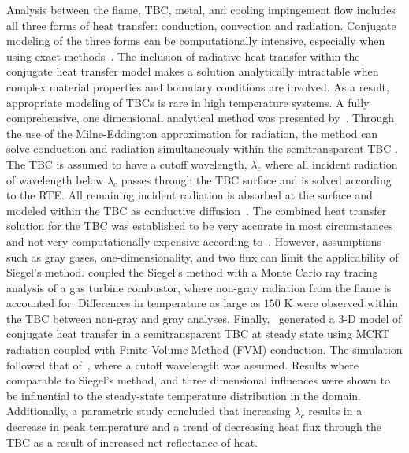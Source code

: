 Analysis between the flame, TBC, metal, and cooling impingement flow includes all three forms of heat
transfer: conduction, convection and radiation. Conjugate modeling of the three forms can be computationally intensive, especially when using exact methods~\cite{Viskanta1975HeatSolids}. 
The inclusion of radiative heat transfer within the conjugate heat transfer model makes a solution analytically intractable when complex material properties and boundary conditions are involved.
As a result, appropriate modeling of TBCs is rare in high temperature systems. A fully comprehensive, one dimensional, analytical method was presented by~\citet{Siegel1996InternalCoatings}. Through the use of the Milne-Eddington approximation for radiation, the method can solve conduction and radiation simultaneously
within the semitransparent TBC \cite{Milne1930ThermodynamicsStars,Eddington1920TheStars}. The TBC is assumed to have a cutoff wavelength, $\lambda{}_c$ where all incident radiation of wavelength below $\lambda{}_c$ passes through the TBC surface and is solved according to the RTE. All remaining incident radiation is absorbed at the surface and modeled within the TBC as conductive diffusion~\cite{Yang2013ExperimentalCoatings}.
The combined heat transfer solution for the TBC was established to be very accurate in most circumstances and not very computationally expensive according to~\citet{Siegel1996InternalCoatings}. 
However, assumptions such as gray gases, one-dimensionality, and two flux can limit the applicability of Siegel’s method. \citet{Johnson2021AnalysisMethod} coupled the Siegel’s method with a Monte Carlo ray tracing analysis of a gas turbine combustor, where non-gray radiation from the flame is accounted for. Differences in temperature as large as $150$ K were observed within the TBC between non-gray and gray analyses.
Finally,~\citet{Tricard2021ModelingEnvironments.} generated a 3-D model of conjugate heat transfer in a semitransparent TBC at steady state using MCRT radiation coupled with Finite-Volume Method (FVM) conduction. 
The simulation followed that of~\citet{Siegel1996InternalCoatings}, where a cutoff wavelength was assumed.
Results where comparable to Siegel's method, and three dimensional influences were shown to be influential to the steady-state temperature distribution in the domain. Additionally, a parametric study concluded that increasing $\lambda{}_c$ results in a decrease in peak temperature and a trend of decreasing heat flux through the TBC as a result of increased net reflectance of heat.
